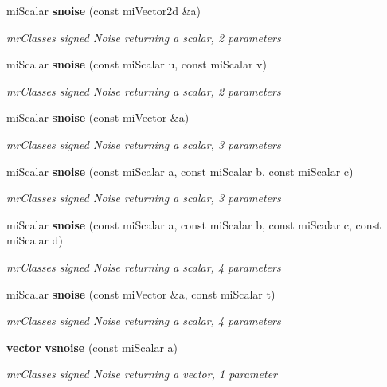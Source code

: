 \begin{CompactItemize}
mi\-Scalar {\bf snoise} (const mi\-Vector2d \&a)
\begin{CompactList}\small\item\em mr\-Classes signed Noise returning a scalar, 2 parameters \item\end{CompactList}\item 
mi\-Scalar {\bf snoise} (const mi\-Scalar u, const mi\-Scalar v)
\begin{CompactList}\small\item\em mr\-Classes signed Noise returning a scalar, 2 parameters \item\end{CompactList}\item 
mi\-Scalar {\bf snoise} (const mi\-Vector \&a)
\begin{CompactList}\small\item\em mr\-Classes signed Noise returning a scalar, 3 parameters \item\end{CompactList}\item 
mi\-Scalar {\bf snoise} (const mi\-Scalar a, const mi\-Scalar b, const mi\-Scalar c)
\begin{CompactList}\small\item\em mr\-Classes signed Noise returning a scalar, 3 parameters \item\end{CompactList}\item 
mi\-Scalar {\bf snoise} (const mi\-Scalar a, const mi\-Scalar b, const mi\-Scalar c, const mi\-Scalar d)
\begin{CompactList}\small\item\em mr\-Classes signed Noise returning a scalar, 4 parameters \item\end{CompactList}\item 
mi\-Scalar {\bf snoise} (const mi\-Vector \&a, const mi\-Scalar t)
\begin{CompactList}\small\item\em mr\-Classes signed Noise returning a scalar, 4 parameters \item\end{CompactList}\item 
{\bf vector} {\bf vsnoise} (const mi\-Scalar a)
\begin{CompactList}\small\item\em mr\-Classes signed Noise returning a vector, 1 parameter \item\end{CompactList}\item 

\end{CompactItemize}
